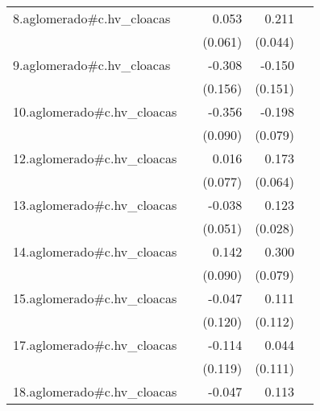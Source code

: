 {\begin{longtable}{l*{4}{D{.}{.}{-1}}}
\addlinespace
8.aglomerado#c.hv\_cloacas&                     &       0.053         &       0.211\sym{***}&                     \\
            &                     &     (0.061)         &     (0.044)         &                     \\
\addlinespace
9.aglomerado#c.hv\_cloacas&                     &      -0.308\sym{*}  &      -0.150         &                     \\
            &                     &     (0.156)         &     (0.151)         &                     \\
\addlinespace
10.aglomerado#c.hv\_cloacas&                     &      -0.356\sym{***}&      -0.198\sym{*}  &                     \\
            &                     &     (0.090)         &     (0.079)         &                     \\
\addlinespace
12.aglomerado#c.hv\_cloacas&                     &       0.016         &       0.173\sym{**} &                     \\
            &                     &     (0.077)         &     (0.064)         &                     \\
\addlinespace
13.aglomerado#c.hv\_cloacas&                     &      -0.038         &       0.123\sym{***}&                     \\
            &                     &     (0.051)         &     (0.028)         &                     \\
\addlinespace
14.aglomerado#c.hv\_cloacas&                     &       0.142         &       0.300\sym{***}&                     \\
            &                     &     (0.090)         &     (0.079)         &                     \\
\addlinespace
15.aglomerado#c.hv\_cloacas&                     &      -0.047         &       0.111         &                     \\
            &                     &     (0.120)         &     (0.112)         &                     \\
\addlinespace
17.aglomerado#c.hv\_cloacas&                     &      -0.114         &       0.044         &                     \\
            &                     &     (0.119)         &     (0.111)         &                     \\
\addlinespace
18.aglomerado#c.hv\_cloacas&                     &      -0.047         &       0.113\sym{**} &                     \\

\end{longtable}}
